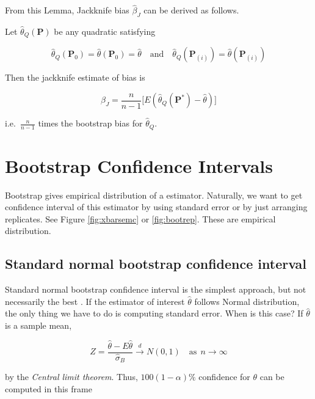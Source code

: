\documentclass[]{book}
\theoremstyle{definition}
\theoremstyle{definition}
\theoremstyle{definition}
\theoremstyle{remark}
\let\BeginKnitrBlock\begin \let\EndKnitrBlock\end
\begin{document}
From this Lemma, Jackknife bias \(\hat\beta_J\) can be derived as follows.

\BeginKnitrBlock{theorem}[Jackknife bias]
\protect\hypertarget{thm:jackbet}{}{\label{thm:jackbet} {} }Let \(\hat\theta_Q (\mathbf{P})\) be any quadratic satisfying

\[\hat\theta_Q (\mathbf{P}_0) = \hat\theta (\mathbf{P}_0) = \hat\theta \quad \text{and} \quad \hat\theta_Q (\mathbf{P}_{(i)}) = \hat\theta (\mathbf{P}_{(i)})\]

Then the jackknife estimate of bias is

\[\beta_J = \frac{n}{n - 1} \Big[ E(\hat\theta_Q (\mathbf{P}^{\ast}) - \hat\theta) \Big]\]

i.e.~\(\frac{n}{n - 1}\) times the bootstrap bias for \(\hat\theta_Q\).
\EndKnitrBlock{theorem}

\hypertarget{bootstrap-confidence-intervals}{%
\section{Bootstrap Confidence Intervals}\label{bootstrap-confidence-intervals}}

Bootstrap gives empirical distribution of a estimator. Naturally, we want to get confidence interval of this estimator by using standard error or by just arranging replicates. See Figure \ref{fig:xbarsemc} or \ref{fig:bootrep}. These are empirical distribution.

\hypertarget{standard-normal-bootstrap-confidence-interval}{%
\subsection{Standard normal bootstrap confidence interval}\label{standard-normal-bootstrap-confidence-interval}}

Standard normal bootstrap confidence interval is the simplest approach, but not necessarily the best \citep{Rizzo:2007aa}. If the estimator of interest \(\hat\theta\) follows Normal distribution, the only thing we have to do is computing standard error. When is this case? If \(\hat\theta\) is a sample mean,

\begin{equation}
  Z = \frac{\hat\theta - E\hat\theta}{\hat\sigma_B} \stackrel{d}{\rightarrow} N(0, 1) \quad \text{as} \:\: n \rightarrow \infty
  \label{eq:bootclt}
\end{equation}

by the \emph{Central limit theorem}. Thus, \(100 (1 - \alpha)\%\) confidence for \(\theta\) can be computed in this frame
\end{document}
